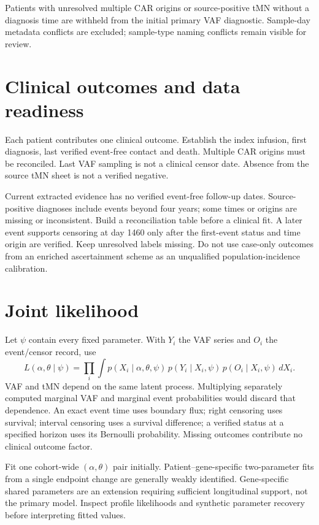 \documentclass[11pt]{article}
\begin{document}
Patients with unresolved multiple CAR origins or source-positive tMN without a diagnosis time are withheld from the initial primary VAF diagnostic. Sample-day metadata conflicts are excluded; sample-type naming conflicts remain visible for review.

\section{Clinical outcomes and data readiness}
Each patient contributes one clinical outcome. Establish the index infusion, first diagnosis, last verified event-free contact and death. Multiple CAR origins must be reconciled. Last VAF sampling is not a clinical censor date. Absence from the source tMN sheet is not a verified negative.

Current extracted evidence has no verified event-free follow-up dates. Source-positive diagnoses include events beyond four years; some times or origins are missing or inconsistent. Build a reconciliation table before a clinical fit. A later event supports censoring at day 1460 only after the first-event status and time origin are verified. Keep unresolved labels missing. Do not use case-only outcomes from an enriched ascertainment scheme as an unqualified population-incidence calibration.

\section{Joint likelihood}
Let $\psi$ contain every fixed parameter. With $Y_i$ the VAF series and $O_i$ the event/censor record, use
\[
L(\alpha,\theta\mid\psi)=\prod_i\int
p(X_i\mid\alpha,\theta,\psi)\,
p(Y_i\mid X_i,\psi)\,
p(O_i\mid X_i,\psi)\,dX_i.
\]
VAF and tMN depend on the same latent process. Multiplying separately computed marginal VAF and marginal event probabilities would discard that dependence. An exact event time uses boundary flux; right censoring uses survival; interval censoring uses a survival difference; a verified status at a specified horizon uses its Bernoulli probability. Missing outcomes contribute no clinical outcome factor.

Fit one cohort-wide $(\alpha,\theta)$ pair initially. Patient--gene-specific two-parameter fits from a single endpoint change are generally weakly identified. Gene-specific shared parameters are an extension requiring sufficient longitudinal support, not the primary model. Inspect profile likelihoods and synthetic parameter recovery before interpreting fitted values.
\end{document}
